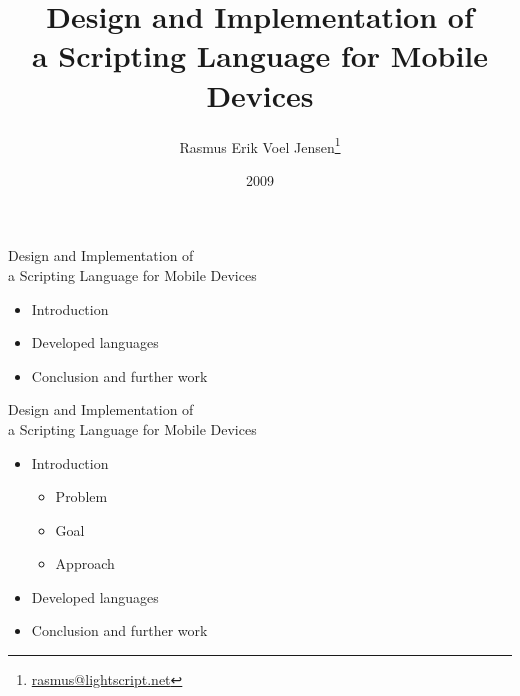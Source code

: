 \documentclass[a4paper,landscape]{slides}
\title{Design and Implementation of \\ a Scripting Language for Mobile Devices }
\author{Rasmus Erik Voel Jensen\footnote{\url{rasmus@lightscript.net}}}
\date{2009}
\begin{document}
\maketitle

\begin{comment}
> talk about programming within the language vs creating the glue between 
> the language and Java. 
\end{comment}

\begin{slide}
        {\large Design and Implementation of \\ a Scripting Language for Mobile Devices \\ \mbox{}}
\begin{itemize}
\item Introduction 
\item Developed languages 
\item Conclusion and further work 
\end{itemize}
\end{slide}

\begin{slide}
        {\large Design and Implementation of \\ a Scripting Language for Mobile Devices \\ \mbox{}}
\begin{itemize}\addtolength{\itemsep}{-\baselineskip}
\item Introduction 
        \begin{itemize}
            \item Problem
            \item Goal
            \item Approach
        \end{itemize}
\item Developed languages 
\item Conclusion and further work 
\end{itemize}
\end{slide}
\end{document}
